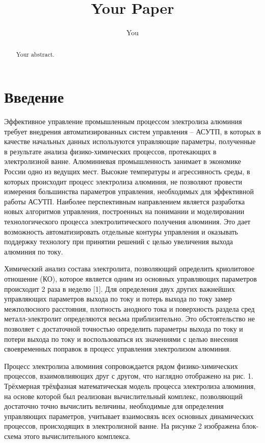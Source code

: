 \documentclass{article}
\title{Your Paper}
\author{You}
\begin{document}
\maketitle

\begin{abstract}
Your abstract.
\end{abstract}

\section*{Введение}

Эффективное управление промышленным процессом электролиза алюминия требует внедрения автоматизированных систем управления – АСУТП, в которых в качестве начальных данных используются управляющие параметры, полученные в результате анализа физико-химических процессов, протекающих в электролизной ванне. Алюминиевая промышленность занимает в экономике России одно из ведущих мест. Высокие температуры и агрессивность среды, в которых происходит процесс электролиза алюминия, не позволяют провести измерения большинства параметров управления, необходимых для эффективной работы АСУТП. Наиболее перспективным направлением является разработка новых алгоритмов управления, построенных на понимании и моделировании технологического процесса электролитического получения алюминия. Это дает возможность автоматизировать отдельные контуры управления и оказывать поддержку технологу при принятии решений с целью увеличения выхода алюминия по току. 

Химический анализ состава электролита, позволяющий определить криолитовое отношение (КО), которое является одним из основных управляющих параметров происходит 2 раза в неделю [1]. Для определения двух других важнейших управляющих параметров выхода по току и потерь выхода по току замер межполюсного расстояния, плотность анодного тока и поверхность раздела сред металл-электролит определяются весьма приблизительно. Это обстоятельство не позволяет с достаточной точностью определить параметры выхода по току и потери выхода по току и воспользоваться их значениями с целью внесения своевременных поправок в процесс управления электролизом алюминия.

Процесс электролиза алюминия сопровождается рядом физико-химических процессов, взаимовлияющих друг с другом, что наглядно отображено на рис. 1. Трёхмерная трёхфазная математическая модель процесса электролиза алюминия, на основе которой был реализован вычислительный комплекс, позволяющий достаточно точно вычислить величины, необходимые для определения управляющих параметров, учитывает взаимосвязь всех основных динамических процессов, происходящих в электролизной ванне. На рисунке 2 изображена блок-схема этого вычислительного комплекса.
\end{document}

